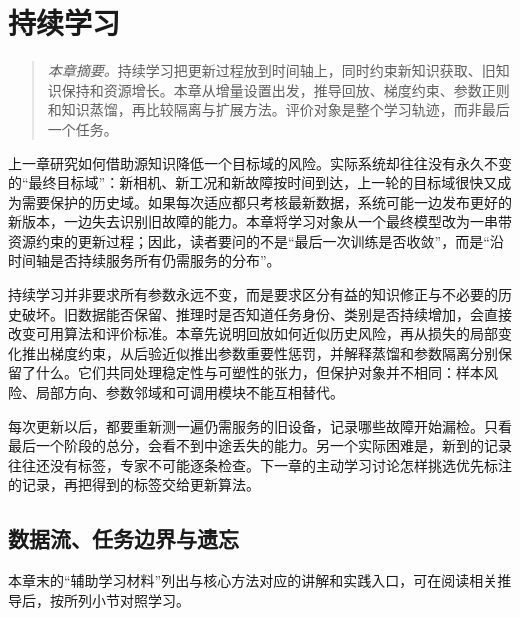 \chapter{持续学习}
\label{chap:continual}
\begin{quote}\small
\textit{本章摘要。}持续学习把更新过程放到时间轴上，同时约束新知识获取、旧知识保持和资源增长。本章从增量设置出发，推导回放、梯度约束、参数正则和知识蒸馏，再比较隔离与扩展方法。评价对象是整个学习轨迹，而非最后一个任务。
\end{quote}

上一章研究如何借助源知识降低一个目标域的风险。实际系统却往往没有永久不变的“最终目标域”：新相机、新工况和新故障按时间到达，上一轮的目标域很快又成为需要保护的历史域。如果每次适应都只考核最新数据，系统可能一边发布更好的新版本，一边失去识别旧故障的能力。本章将学习对象从一个最终模型改为一串带资源约束的更新过程；因此，读者要问的不是“最后一次训练是否收敛”，而是“沿时间轴是否持续服务所有仍需服务的分布”。

持续学习并非要求所有参数永远不变，而是要求区分有益的知识修正与不必要的历史破坏。旧数据能否保留、推理时是否知道任务身份、类别是否持续增加，会直接改变可用算法和评价标准。本章先说明回放如何近似历史风险，再从损失的局部变化推出梯度约束，从后验近似推出参数重要性惩罚，并解释蒸馏和参数隔离分别保留了什么。它们共同处理稳定性与可塑性的张力，但保护对象并不相同：样本风险、局部方向、参数邻域和可调用模块不能互相替代。

每次更新以后，都要重新测一遍仍需服务的旧设备，记录哪些故障开始漏检。只看最后一个阶段的总分，会看不到中途丢失的能力。另一个实际困难是，新到的记录往往还没有标签，专家不可能逐条检查。下一章的主动学习讨论怎样挑选优先标注的记录，再把得到的标签交给更新算法。

\section{数据流、任务边界与遗忘}

本章末的“辅助学习材料”列出与核心方法对应的讲解和实践入口，可在阅读相关推导后，按所列小节对照学习。

